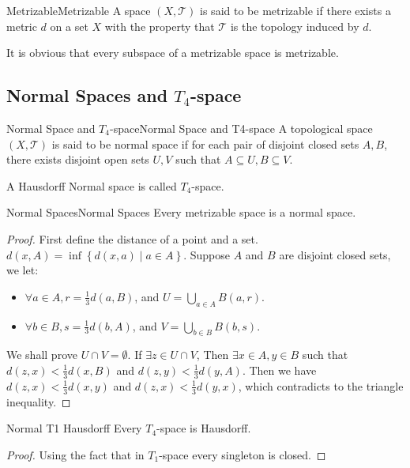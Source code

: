 \documentclass[../main.tex]{subfiles}
\begin{document}
\begin{definition}{Metrizable}{Metrizable}
A space $(X,\mathcal{T})$ is said to be metrizable if there exists a metric $d$ on a set $X$ with the property that $\mathcal{T}$ is the topology induced by $d$.
\end{definition}

It is obvious that every subspace of a metrizable space is metrizable.

\subsection{Normal Spaces and $T_4$-space}
\begin{definition}{Normal Space and $T_4$-space}{Normal Space and T4-space}
A topological space $(X,\mathcal{T})$ is said to be normal space if for each pair of disjoint closed sets $A,B$, there exists disjoint open sets $U,V$ such that $A \subseteq U,B \subseteq V$.

A Hausdorff Normal space is called $T_4$-space.
\end{definition}
\begin{proposition}{Normal Spaces}{Normal Spaces}
Every metrizable space is a normal space.
\end{proposition}
\begin{proof}
First define the distance of a point and a set. $d(x,A) = \inf\left\{ d(x,a) \mid a\in A \right\}$. Suppose $A$ and $B$ are disjoint closed sets, we let:
\begin{itemize}
\item $\forall a\in A, r = \frac{1}{3}d(a,B)$, and $\displaystyle U = \bigcup_{a\in A}B(a,r)$.
\item $\forall b\in B, s = \frac{1}{3}d(b,A)$, and $\displaystyle V = \bigcup_{b\in B}B(b,s) $.
\end{itemize}
We shall prove $U\cap V = \emptyset $. If $\exists z\in U\cap V$, Then $\exists x\in A,y\in B$ such that $d(z,x) < \frac{1}{3}d(x, B)$ and $d(z,y) < \frac{1}{3}d(y,A)$. Then we have $d(z,x) < \frac{1}{3}d(x,y)$ and $d(z,x)<\frac{1}{3}d(y,x)$, which contradicts to the triangle inequality.
\end{proof}

\begin{proposition}{}{Normal T1 Hausdorff}
Every $T_4$-space is Hausdorff.
\end{proposition}
\begin{proof}
Using the fact that in $T_1$-space every singleton is closed.
\end{proof}
\end{document}
